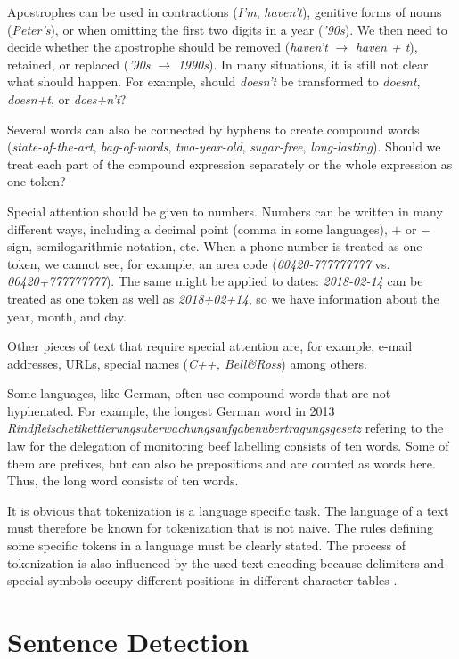 Apostrophes can be used in contractions (\textit{I’m}, \textit{haven’t}), genitive forms of
nouns (\textit{Peter’s}), or when omitting the first two digits in a year (\textit{’90s}). We then
need to decide whether the apostrophe should be removed (\textit{haven’t} $\to$ \textit{haven + t}),
retained, or replaced (\textit{’90s} $\to$ \textit{1990s}). In many situations, it is still not clear
what should happen. For example, should \textit{doesn’t} be transformed to \textit{doesnt}, 
\textit{doesn+t}, or \textit{does+n’t}?

Several words can also be connected by hyphens to create compound words
(\textit{state-of-the-art}, \textit{bag-of-words}, \textit{two-year-old}, 
\textit{sugar-free}, \textit{long-lasting}). Should
we treat each part of the compound expression separately or the whole expression
as one token?

Special attention should be given to numbers. Numbers can be written in
many different ways, including a decimal point (comma in some languages),
$+$ or $-$ sign, semilogarithmic notation, etc. When a phone number is treated
as one token, we cannot see, for example, an area code (\textit{00420-777777777} vs.
\textit{00420+777777777}). The same might be applied to dates: \textit{2018-02-14} can be
treated as one token as well as \textit{2018+02+14}, so we have information about the year,
month, and day.

Other pieces of text that require special attention are, for example, e-mail
addresses, URLs, special names (\textit{C++, Bell\&Ross}) among others.

Some languages, like German, often use compound words that are not hyphenated. For example, the longest German word in 2013 \cite{ref265}\textit{Rindfleischetikettierungsuberwachungsaufgabenubertragungsgesetz} refering to the law for the
delegation of monitoring beef labelling consists of ten words. Some of them are
prefixes, but can also be prepositions and are counted as words here. Thus, the
long word consists of ten words.

It is obvious that tokenization is a language specific task. The language of a
text must therefore be known for tokenization that is not naive. The rules defining some specific tokens in a language must be clearly stated. The process of
tokenization is also influenced by the used text encoding because delimiters and
special symbols occupy different positions in different character tables \cite{ref211}.

\section{Sentence Detection}

